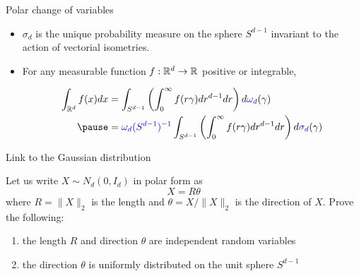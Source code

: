 \documentclass[10pt]{beamer}
\begin{document}
  \begin{frame}{Polar change of variables}
    \begin{theorem}
      \begin{itemize}
      \item $\sigma_{d}$ is the unique probability measure on the sphere
        $S^{d-1}$ invariant to the action of vectorial isometries.

        \pause

      \item For any measurable function $f: \mathbb{R}^{d} \to \mathbb{R}$ positive or integrable,

        \begin{equation*}
          \begin{aligned}
            \int_{\R^{d}} f(x) d x &=\int_{S^{d-1}}\left(\int_{0}^{\infty} f(r \gamma) dr^{d-1} d r\right) d \textcolor{blue}{\omega_d}(\gamma) \\ \pause
            &= \textcolor{blue}{\omega_d(S^{d-1})^{-1}} \int_{S^{d-1}}\left(\int_{0}^{\infty} f(r \gamma) dr^{d-1} d r\right) d \textcolor{blue}{\sigma_d}(\gamma)
          \end{aligned}
        \end{equation*}


      \end{itemize}

    \end{theorem}

  \end{frame}

  \begin{frame}{Link to the Gaussian distribution}
    \begin{proposition}[Exercise 3.3.7] Let us write $X \sim N_d\left(0, I_{d}\right)$ in
      polar  form as
      $$
      X=R \theta
      $$
      where $R=\|X\|_{2}$ is the length and $\theta=X /\|X\|_{2}$ is the direction
      of $X$. Prove the following:

      \pause

      \begin{enumerate}
      \item the length $R$ and direction $\theta$ are independent random
        variables
        \pause
      \item the direction $\theta$ is uniformly distributed on the unit sphere
        $S^{d-1}$
      \end{enumerate}
    \end{proposition}

  \end{frame}

\end{document}

